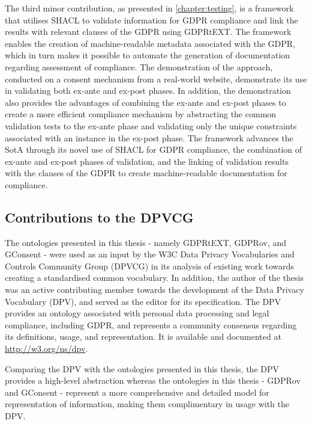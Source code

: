 The third minor contribution, as presented in \autoref{chapter:testing}, is a framework that utilises SHACL to validate information for GDPR compliance and link the results with relevant clauses of the GDPR using GDPRtEXT. 
The framework enables the creation of machine-readable metadata associated with the GDPR, which in turn makes it possible to automate the generation of documentation regarding assessment of compliance.
The demonstration of the approach, conducted on a consent mechanism from a real-world website, demonstrate its use in validating both ex-ante and ex-post phases.
In addition, the demonstration also provides the advantages of combining the ex-ante and ex-post phases to create a more efficient compliance mechanism by abstracting the common validation tests to the ex-ante phase and validating only the unique constraints associated with an instance in the ex-post phase.
The framework advances the SotA through its novel use of SHACL for GDPR compliance, the combination of ex-ante and ex-post phases of validation, and the linking of validation results with the clauses of the GDPR to create machine-readable documentation for compliance.

\subsection*{Contributions to the DPVCG}
The ontologies presented in this thesis - namely GDPRtEXT, GDPRov, and GConsent - were used as an input by the W3C Data Privacy Vocabularies and Controls Community Group (DPVCG) in its analysis of existing work towards creating a standardised common vocabulary.
In addition, the author of the thesis was an active contributing member towards the development of the Data Privacy Vocabulary (DPV), and served as the editor for its specification.
The DPV provides an ontology associated with personal data processing and legal compliance, including GDPR, and represents a community consensus regarding its definitions, usage, and representation.
It is available and documented at \url{http://w3.org/ns/dpv}.

Comparing the DPV with the ontologies presented in this thesis, the DPV provides a high-level abstraction whereas the ontologies in this thesis - GDPRov and GConsent - represent a more comprehensive and detailed model for representation of information, making them complimentary in usage with the DPV.

